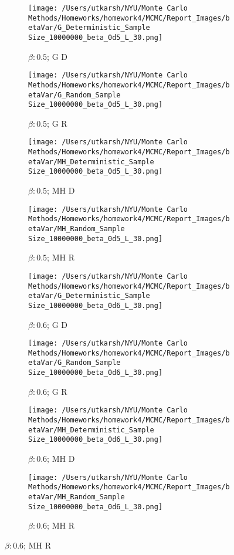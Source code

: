 \documentclass[11pt]{article}
\begin{document}
\begin{figure}[H]
	\centering
	\begin{subfigure}{.23\textwidth}
		\texttt{[image: /Users/utkarsh/NYU/Monte Carlo Methods/Homeworks/homework4/MCMC/Report\_Images/betaVar/G\_Deterministic\_Sample Size\_10000000\_beta\_0d5\_L\_30.png]}
		\caption{$\beta: 0.5$; G D}
	\end{subfigure}
	\begin{subfigure}{.23\textwidth}
		\texttt{[image: /Users/utkarsh/NYU/Monte Carlo Methods/Homeworks/homework4/MCMC/Report\_Images/betaVar/G\_Random\_Sample Size\_10000000\_beta\_0d5\_L\_30.png]}
		\caption{$\beta: 0.5$; G R}
	\end{subfigure}
	\begin{subfigure}{.23\textwidth}
		\texttt{[image: /Users/utkarsh/NYU/Monte Carlo Methods/Homeworks/homework4/MCMC/Report\_Images/betaVar/MH\_Deterministic\_Sample Size\_10000000\_beta\_0d5\_L\_30.png]}
		\caption{$\beta: 0.5$; MH D}
	\end{subfigure}
	\begin{subfigure}{.23\textwidth}
		\texttt{[image: /Users/utkarsh/NYU/Monte Carlo Methods/Homeworks/homework4/MCMC/Report\_Images/betaVar/MH\_Random\_Sample Size\_10000000\_beta\_0d5\_L\_30.png]}
		\caption{$\beta: 0.5$; MH R}
	\end{subfigure}

	\begin{subfigure}{.23\textwidth}
		\texttt{[image: /Users/utkarsh/NYU/Monte Carlo Methods/Homeworks/homework4/MCMC/Report\_Images/betaVar/G\_Deterministic\_Sample Size\_10000000\_beta\_0d6\_L\_30.png]}
		\caption{$\beta: 0.6$; G D}
	\end{subfigure}
	\begin{subfigure}{.23\textwidth}
		\texttt{[image: /Users/utkarsh/NYU/Monte Carlo Methods/Homeworks/homework4/MCMC/Report\_Images/betaVar/G\_Random\_Sample Size\_10000000\_beta\_0d6\_L\_30.png]}
		\caption{$\beta: 0.6$; G R}
	\end{subfigure}
	\begin{subfigure}{.23\textwidth}
		\texttt{[image: /Users/utkarsh/NYU/Monte Carlo Methods/Homeworks/homework4/MCMC/Report\_Images/betaVar/MH\_Deterministic\_Sample Size\_10000000\_beta\_0d6\_L\_30.png]}
		\caption{$\beta: 0.6$; MH D}
	\end{subfigure}
	\begin{subfigure}{.23\textwidth}
		\texttt{[image: /Users/utkarsh/NYU/Monte Carlo Methods/Homeworks/homework4/MCMC/Report\_Images/betaVar/MH\_Random\_Sample Size\_10000000\_beta\_0d6\_L\_30.png]}
		\caption{$\beta: 0.6$; MH R}
	\end{subfigure}


\end{figure}
\end{document}
